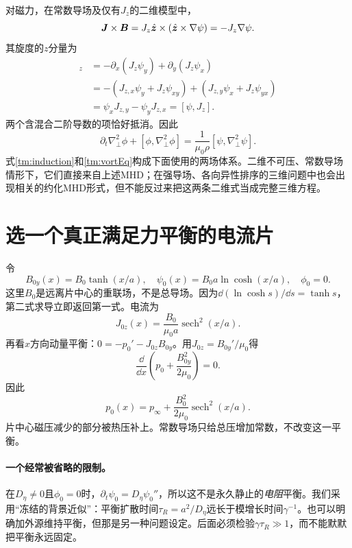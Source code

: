 对磁力，在常数导场及仅有$J_z$的二维模型中，
\begin{equation}
 \bm{J}\times\bm{B}=J_z\hat{\bm{z}}\times(\hat{\bm{z}}\times\nabla\psi)
 =-J_z\nabla\psi.
\end{equation}
其旋度的$z$分量为
\begin{align}
 [\nabla\times(-J_z\nabla\psi)]_z
 &=-\partial_x(J_z\psi_y)+\partial_y(J_z\psi_x)\\
 &=-(J_{z,x}\psi_y+J_z\psi_{xy})+(J_{z,y}\psi_x+J_z\psi_{yx})\\
 &=\psi_xJ_{z,y}-\psi_yJ_{z,x}=[\psi,J_z].
\end{align}
两个含混合二阶导数的项恰好抵消。因此
\begin{equation}
 \boxed{\partial_t\nabla_\perp^2\phi+[\phi,\nabla_\perp^2\phi]
 =\frac{1}{\mu_0\rho}[\psi,\nabla_\perp^2\psi].}
 \label{tm:vortEq}
\end{equation}
式\eqref{tm:induction}和\eqref{tm:vortEq}构成下面使用的两场体系。二维不可压、常数导场情形下，它们直接来自上述MHD；在强导场、各向异性排序的三维问题中也会出现相关的约化MHD形式，但不能反过来把这两条二维式当成完整三维方程。\citep{TMLoureiro2007}

\section{选一个真正满足力平衡的电流片}
令
\begin{equation}
 B_{0y}(x)=B_0\tanh(x/a),\quad
 \psi_0(x)=B_0a\ln\cosh(x/a),\quad \phi_0=0.
 \label{tm:Harris}
\end{equation}
这里$B_0$是远离片中心的重联场，不是总导场。因为$\dd(\ln\cosh s)/\dd s=\tanh s$，第二式求导立即返回第一式。电流为
\begin{equation}
 J_{0z}(x)=\frac{B_0}{\mu_0a}\operatorname{sech}^2(x/a).
\end{equation}
再看$x$方向动量平衡：$0=-p_0'-J_{0z}B_{0y}$。用$J_{0z}=B_{0y}'/\mu_0$得
\begin{equation}
 \frac{\dd}{\dd x}\left(p_0+\frac{B_{0y}^2}{2\mu_0}\right)=0.
\end{equation}
因此
\begin{equation}
 p_0(x)=p_\infty+\frac{B_0^2}{2\mu_0}\operatorname{sech}^2(x/a).
\end{equation}
片中心磁压减少的部分被热压补上。常数导场只给总压增加常数，不改变这一平衡。

\paragraph{一个经常被省略的限制。}
在$D_\eta\ne0$且$\phi_0=0$时，$\partial_t\psi_0=D_\eta\psi_0''$，所以这不是永久静止的\emph{电阻}平衡。我们采用“冻结的背景近似”：平衡扩散时间$\tau_R=a^2/D_\eta$远长于模增长时间$\gamma^{-1}$。也可以明确加外源维持平衡，但那是另一种问题设定。后面必须检验$\gamma\tau_R\gg1$，而不能默默把平衡永远固定。

